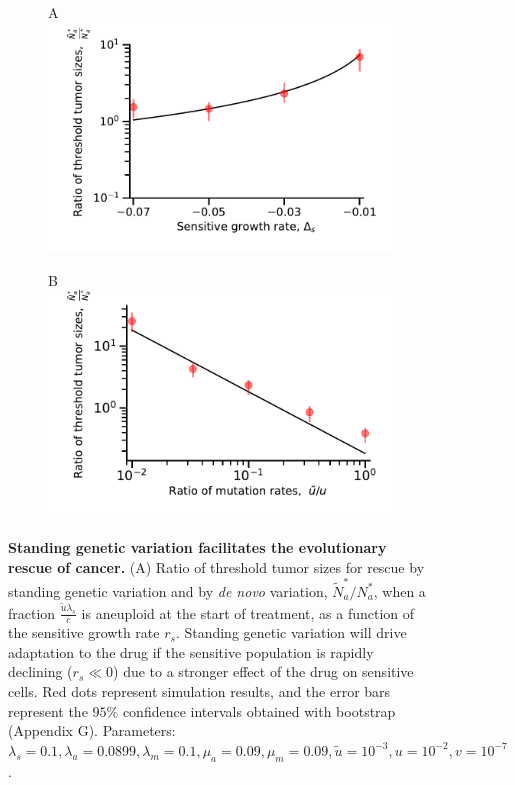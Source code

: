 \documentclass[12pt]{extarticle}
\renewcommand{\Delta}{r}
\begin{document}
\begin{figure}
\begin{subfigure}{0.5\textwidth}
A\\
\includegraphics[width=1\textwidth]{Figures/RatiodsPlot.pdf}
\end{subfigure}
\begin{subfigure}{0.5\textwidth}
B\\
\includegraphics[width=1\textwidth]{Figures/ratio_uPlot.pdf}
\end{subfigure}
\caption{
\textbf{Standing genetic variation facilitates the evolutionary rescue of cancer.}
(A)  Ratio of threshold tumor sizes for rescue by standing genetic variation and by \textit{de novo} variation, $\tilde{N}_a^*/N_a^*$, when a fraction $\frac{\tilde{u}\lambda_s}{c}$ is aneuploid at the start of treatment, as a function of the sensitive growth rate $\Delta_s$.  Standing genetic variation will drive adaptation to the drug if the sensitive population is rapidly declining ($\Delta_s\ll0$) due to a stronger effect of the drug on sensitive cells. Red dots represent simulation results, and the error bars represent the $95\%$ confidence intervals obtained with bootstrap (Appendix G). Parameters: $\lambda_s=0.1,\lambda_a=0.0899,\lambda_m=0.1,\mu_a=0.09,\mu_m=0.09,\tilde{u}=10^{-3},u=10^{-2}, v=10^{-7}$.
}
\end{figure}
\end{document}
